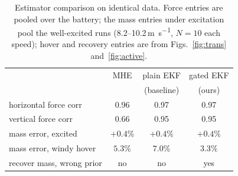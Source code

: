\documentclass{ieeeaccess}
\def\DIFaddbegin{\color{blue}}\def\DIFaddend{\color{black}}\def\DIFdelbegin{}\def\DIFdelend{} %
\begin{document}
\DIFdelbegin %
\DIFdelend \DIFaddbegin \begin{table}[t]\color{blue}
\centering
\caption{Estimator comparison on identical data. Force entries are pooled over
the battery; the mass entries under excitation pool the well-excited runs
(8.2--10.2\,\si{\meter\per\second}, $N{=}10$ each speed); hover and recovery
entries are from Figs.~\ref{fig:trans} and~\ref{fig:active}.}
\label{tab:compare}
\begin{tabular}{lccc}
\toprule
 & MHE & plain EKF & gated EKF \\
 &     & (baseline) & (ours) \\
\midrule
horizontal force corr      & 0.96 & 0.97 & 0.97 \\
vertical force corr        & 0.66 & 0.95 & 0.95 \\
mass error, excited        & $+0.4\%$ & $+0.4\%$ & $+0.4\%$ \\
mass error, windy hover    & $5.3\%$ & $7.0\%$ & $\mathbf{3.3\%}$ \\
recover mass, wrong prior  & no & no & yes \\
\bottomrule
\end{tabular}
\end{table}
\DIFaddend 
\end{document}
